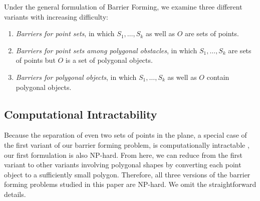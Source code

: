 Under the general formulation of Barrier Forming, we examine three different variants with increasing difficulty:
\begin{enumerate} 
\item \emph{Barriers for point sets}, in which  $S_1, \dots, S_k$ as well as $O$ are sets of points. 
\item \emph{Barriers for point sets among polygonal obstacles}, in which  $S_1, \dots, S_k$ are sets of points but $O$ is a set of polygonal objects. 
\item \emph{Barriers for polygonal objects}, in which $S_1, \dots, S_k$ as well as $O$ contain polygonal objects. 
\end{enumerate}

\subsection{Computational Intractability}
Because the separation of even two sets of points in the plane, 
a special case of the first variant of our barrier forming problem, 
is computationally intractable \cite{demaine2005separating}, 
our first formulation is also NP-hard. 
From here, we can reduce from the first variant to other variants involving polygonal shapes by converting each point object to a sufficiently small polygon. Therefore, all three versions of the barrier forming problems studied in this paper are NP-hard. We omit the straightforward details. 